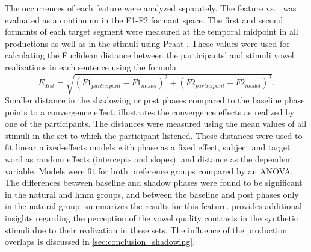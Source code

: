 The occurrences of each feature were analyzed separately.
The feature \textipa{[E:]} vs.\ \textipa{[e:]} was evaluated as a continuum in the F1-F2 formant space.
The first and second formants of each target segment were measured at the temporal midpoint in all productions as well as in the stimuli using Praat \citep{Boersma2018praat}.
These values were used for calculating the Euclidean distance between the participants' and stimuli vowel realizations in each sentence using the formula
%
\begin{equation}
	E_{dist}=\sqrt{(F1_{participant}-F1_{model})^2+(F2_{participant}-F2_{model})^2}.
\end{equation}
\noindent
%
Smaller distance in the shadowing or post phases compared to the baseline phase points to a convergence effect.
 illustrates the convergence effects as realized by one of the participants.
The distances were measured using the mean values of all stimuli in the set to which the participant listened.
These distances were used to fit linear mixed-effects models with phase as a fixed effect, subject and target word as random effects (intercepts and slopes), and distance as the dependent variable.
Models were fit for both preference groups compared by an ANOVA.
The differences between baseline and shadow phases were found to be significant in the natural and \ac{hmm} groups, and between the baseline and post phases only in the natural group.
 summarizes the results for this feature.
 provides additional insights regarding the perception of the vowel quality contrasts in the synthetic stimuli due to their realization in these sets.
The influence of the production overlaps is discussed in \cref{sec:conclusion_shadowing}.
%
